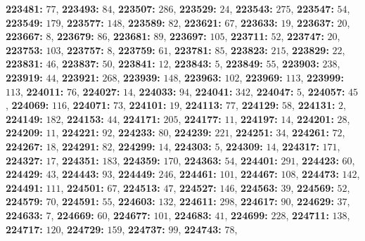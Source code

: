 \textsf{\bfseries 223481:} $77$, \textsf{\bfseries 223493:} $84$, \textsf{\bfseries 223507:} $286$, \textsf{\bfseries 223529:} $24$, \textsf{\bfseries 223543:} $275$, \textsf{\bfseries 223547:} $54$, \textsf{\bfseries 223549:} $179$, \textsf{\bfseries 223577:} $148$, \textsf{\bfseries 223589:} $82$, \textsf{\bfseries 223621:} $67$, \textsf{\bfseries 223633:} $19$, \textsf{\bfseries 223637:} $20$, \textsf{\bfseries 223667:} $8$, \textsf{\bfseries 223679:} $86$, \textsf{\bfseries 223681:} $89$, \textsf{\bfseries 223697:} $105$, \textsf{\bfseries 223711:} $52$, \textsf{\bfseries 223747:} $20$, \textsf{\bfseries 223753:} $103$, \textsf{\bfseries 223757:} $8$, \textsf{\bfseries 223759:} $61$, \textsf{\bfseries 223781:} $85$, \textsf{\bfseries 223823:} $215$, \textsf{\bfseries 223829:} $22$, \textsf{\bfseries 223831:} $46$, \textsf{\bfseries 223837:} $50$, \textsf{\bfseries 223841:} $12$, \textsf{\bfseries 223843:} $5$, \textsf{\bfseries 223849:} $55$, \textsf{\bfseries 223903:} $238$, \textsf{\bfseries 223919:} $44$, \textsf{\bfseries 223921:} $268$, \textsf{\bfseries 223939:} $148$, \textsf{\bfseries 223963:} $102$, \textsf{\bfseries 223969:} $113$, \textsf{\bfseries 223999:} $113$, \textsf{\bfseries 224011:} $76$, \textsf{\bfseries 224027:} $14$, \textsf{\bfseries 224033:} $94$, \textsf{\bfseries 224041:} $342$, \textsf{\bfseries 224047:} $5$, \textsf{\bfseries 224057:} $45$, \textsf{\bfseries 224069:} $116$, \textsf{\bfseries 224071:} $73$, \textsf{\bfseries 224101:} $19$, \textsf{\bfseries 224113:} $77$, \textsf{\bfseries 224129:} $58$, \textsf{\bfseries 224131:} $2$, \textsf{\bfseries 224149:} $182$, \textsf{\bfseries 224153:} $44$, \textsf{\bfseries 224171:} $205$, \textsf{\bfseries 224177:} $11$, \textsf{\bfseries 224197:} $14$, \textsf{\bfseries 224201:} $28$, \textsf{\bfseries 224209:} $11$, \textsf{\bfseries 224221:} $92$, \textsf{\bfseries 224233:} $80$, \textsf{\bfseries 224239:} $221$, \textsf{\bfseries 224251:} $34$, \textsf{\bfseries 224261:} $72$, \textsf{\bfseries 224267:} $18$, \textsf{\bfseries 224291:} $82$, \textsf{\bfseries 224299:} $14$, \textsf{\bfseries 224303:} $5$, \textsf{\bfseries 224309:} $14$, \textsf{\bfseries 224317:} $171$, \textsf{\bfseries 224327:} $17$, \textsf{\bfseries 224351:} $183$, \textsf{\bfseries 224359:} $170$, \textsf{\bfseries 224363:} $54$, \textsf{\bfseries 224401:} $291$, \textsf{\bfseries 224423:} $60$, \textsf{\bfseries 224429:} $43$, \textsf{\bfseries 224443:} $93$, \textsf{\bfseries 224449:} $246$, \textsf{\bfseries 224461:} $101$, \textsf{\bfseries 224467:} $108$, \textsf{\bfseries 224473:} $142$, \textsf{\bfseries 224491:} $111$, \textsf{\bfseries 224501:} $67$, \textsf{\bfseries 224513:} $47$, \textsf{\bfseries 224527:} $146$, \textsf{\bfseries 224563:} $39$, \textsf{\bfseries 224569:} $52$, \textsf{\bfseries 224579:} $70$, \textsf{\bfseries 224591:} $55$, \textsf{\bfseries 224603:} $132$, \textsf{\bfseries 224611:} $298$, \textsf{\bfseries 224617:} $90$, \textsf{\bfseries 224629:} $37$, \textsf{\bfseries 224633:} $7$, \textsf{\bfseries 224669:} $60$, \textsf{\bfseries 224677:} $101$, \textsf{\bfseries 224683:} $41$, \textsf{\bfseries 224699:} $228$, \textsf{\bfseries 224711:} $138$, \textsf{\bfseries 224717:} $120$, \textsf{\bfseries 224729:} $159$, \textsf{\bfseries 224737:} $99$, \textsf{\bfseries 224743:} $78$, 
